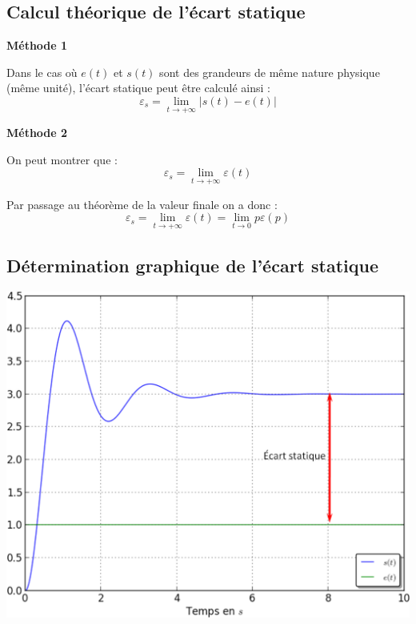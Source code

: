 \documentclass[11pt,oneside]{article}
\begin{document}
{\begin{minipage}[t]{.48\linewidth}
\subsection*{Calcul théorique de l'écart statique}
\begin{methode}

\textbf{Méthode 1 }

Dans le cas où $e(t)$ et $s(t)$ sont des grandeurs de même nature physique (même unité), l'écart statique peut être calculé ainsi :
$$
\varepsilon_s = \lim\limits_{t\to +\infty} |s(t)-e(t)|
$$


\textbf{Méthode 2}

On peut montrer que :
$$
\varepsilon_s = \lim\limits_{t\to +\infty} \varepsilon(t)
$$

Par passage au théorème de la valeur finale on a donc : 
$$
\varepsilon_s = \lim\limits_{t\to +\infty} \varepsilon(t)=  \lim\limits_{t\to 0} p \varepsilon(p)
$$
\end{methode}

\end{minipage}\hfill
\begin{minipage}[t]{.48\linewidth}
\subsection*{Détermination graphique de l'écart statique}

\vspace{1cm}

\begin{center}
\includegraphics[width=\textwidth]{png/EcartStatique.png}
\end{center}


\end{minipage}}
\end{document}

